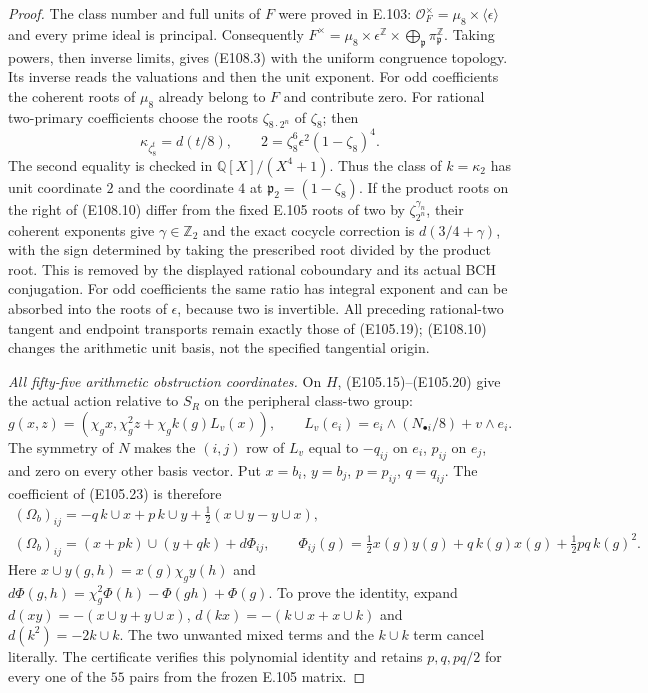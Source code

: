 \begin{proof}
The class number and full units of $F$ were proved in E.103:
$\mathcal O_F^\times=\mu_8\times\langle\epsilon\rangle$ and
every prime ideal is principal.  Consequently
$F^\times=\mu_8\times\epsilon^{\mathbb Z}\times
\bigoplus_{\mathfrak p}\pi_{\mathfrak p}^{\mathbb Z}$.
Taking powers, then inverse limits, gives (E108.3) with the
uniform congruence topology.  Its inverse reads the valuations
and then the unit exponent.  For odd coefficients the coherent
roots of $\mu_8$ already belong to $F$ and contribute zero.
For rational two-primary coefficients choose the roots
$\zeta_{8\cdot2^n}$ of $\zeta_8$; then
\[
 \kappa_{\zeta_8^t}=d(t/8),\qquad
 2=\zeta_8^6\epsilon^2(1-\zeta_8)^4.
 \tag{E108.10}
\]
The second equality is checked in $\mathbb Q[X]/(X^4+1)$.
Thus the class of $k=\kappa_2$ has unit coordinate $2$ and
the coordinate $4$ at $\mathfrak p_2=(1-\zeta_8)$.
If the product roots on the right of (E108.10) differ from the
fixed E.105 roots of two by $\zeta_{2^n}^{\gamma_n}$, their
coherent exponents give $\gamma\in\mathbb Z_2$ and the exact
cocycle correction is $d(3/4+\gamma)$, with the sign determined
by taking the prescribed root divided by the product root.
This is removed by the displayed rational coboundary and its
actual BCH conjugation.  For odd coefficients the same ratio
has integral exponent and can be absorbed into the roots of
$\epsilon$, because two is invertible.
All preceding rational-two tangent and endpoint transports
remain exactly those of (E105.19); (E108.10) changes the
arithmetic unit basis, not the specified tangential origin.

\emph{All fifty-five arithmetic obstruction coordinates.}
On $H$, (E105.15)--(E105.20) give the actual action relative
to $S_R$ on the peripheral class-two group:
\[
 g(x,z)=(\chi_gx,\chi_g^2z+\chi_gk(g)L_v(x)),\qquad
 L_v(e_i)=e_i\wedge(N_{\bullet i}/8)+v\wedge e_i.
 \tag{E108.11}
\]
The symmetry of $N$ makes the $(i,j)$ row of $L_v$ equal to
$-q_{ij}$ on $e_i$, $p_{ij}$ on $e_j$, and zero on every
other basis vector.  Put $x=b_i$, $y=b_j$, $p=p_{ij}$,
$q=q_{ij}$.  The coefficient of (E105.23) is therefore
\[
 \begin{gathered}
 (\Omega_b)_{ij}=-q\,k\cup x+p\,k\cup y
                       +\tfrac12(x\cup y-y\cup x),\\
 (\Omega_b)_{ij}=(x+pk)\cup(y+qk)+d\Phi_{ij},\qquad
 \Phi_{ij}(g)=\tfrac12x(g)y(g)+q\,k(g)x(g)
                                      +\tfrac12pq\,k(g)^2.
 \end{gathered}
 \tag{E108.12}
\]
Here $x\cup y(g,h)=x(g)\chi_g y(h)$ and
$d\Phi(g,h)=\chi_g^2\Phi(h)-\Phi(gh)+\Phi(g)$.
To prove the identity, expand
$d(xy)=-(x\cup y+y\cup x)$,
$d(kx)=-(k\cup x+x\cup k)$ and
$d(k^2)=-2k\cup k$.  The two unwanted mixed terms and the
$k\cup k$ term cancel literally.  The certificate verifies
this polynomial identity and retains $p,q,pq/2$ for every
one of the $55$ pairs from the frozen E.105 matrix.


\end{proof}
